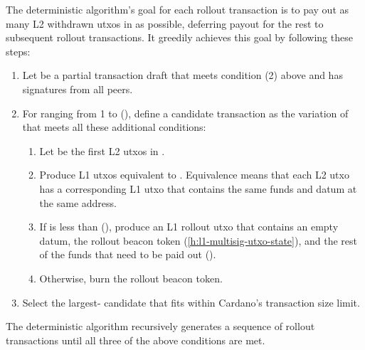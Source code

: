 \documentclass[../hydrozoa.tex]{subfiles}
\begin{document}
The deterministic algorithm's goal for each rollout transaction is to pay out as many L2 withdrawn utxos in  as possible, deferring payout for the rest to subsequent rollout transactions.
It greedily achieves this goal by following these steps:
\begin{enumerate}
  \item Let  be a partial transaction draft that meets condition (2) above and has signatures from all peers.
  \item For  ranging from 1 to (), define a candidate transaction as the variation of  that meets all these additional conditions:
    \begin{enumerate}
      \item Let  be the first  L2 utxos in .
      \item Produce L1 utxos equivalent to .
        Equivalence means that each L2 utxo has a corresponding L1 utxo that contains the same funds and datum at the same address.
      \item If  is less than (), produce an L1 rollout utxo that contains an empty datum, the rollout beacon token (\cref{h:l1-multisig-utxo-state}), and the rest of the funds that need to be paid out
        ().
      \item Otherwise, burn the rollout beacon token.
    \end{enumerate}
  \item Select the largest- candidate that fits within Cardano's transaction size limit.
\end{enumerate}

The deterministic algorithm recursively generates a sequence of rollout transactions until all three of the above conditions are met.
\end{document}
